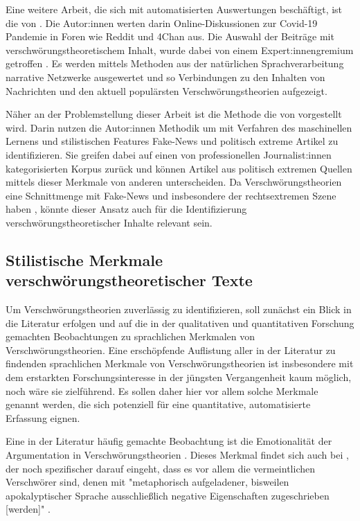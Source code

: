 Eine weitere Arbeit, die sich mit automatisierten Auswertungen beschäftigt, ist die von \textcite{shahsavari_2020}.
Die Autor:innen werten darin Online-Diskussionen zur Covid-19 Pandemie in Foren wie Reddit und 4Chan aus.
Die Auswahl der Beiträge mit verschwörungstheoretischem Inhalt, wurde dabei von einem Expert:innengremium getroffen \parencite[284f]{shahsavari_2020}.
Es werden mittels Methoden aus der natürlichen Sprachverarbeitung narrative Netzwerke ausgewertet und so Verbindungen zu den Inhalten von Nachrichten und den aktuell populärsten Verschwörungstheorien aufgezeigt.

Näher an der Problemstellung dieser Arbeit ist die Methode die von \textcite{potthast_2018} vorgestellt wird.
Darin nutzen die Autor:innen Methodik um mit Verfahren des maschinellen Lernens und stilistischen Features Fake-News und politisch extreme Artikel zu identifizieren.
Sie greifen dabei auf einen von professionellen Journalist:innen kategorisierten Korpus zurück und können Artikel aus politisch extremen Quellen mittels dieser Merkmale von anderen unterscheiden.
Da Verschwörungstheorien eine Schnittmenge mit Fake-News und insbesondere der rechtsextremen Szene haben \parencite[vgl.][]{stumpf_2019}, könnte dieser Ansatz auch für die Identifizierung verschwörungstheoretischer Inhalte relevant sein.

\subsection{Stilistische Merkmale verschwörungstheoretischer Texte}

Um Verschwörungstheorien zuverlässig zu identifizieren, soll zunächst ein Blick in die Literatur erfolgen und auf die in der qualitativen und quantitativen Forschung gemachten Beobachtungen zu sprachlichen Merkmalen von Verschwörungstheorien.
Eine erschöpfende Auflistung aller in der Literatur zu findenden sprachlichen Merkmale von Verschwörungstheorien ist insbesondere mit dem erstarkten Forschungsinteresse in der jüngsten Vergangenheit kaum möglich, noch wäre sie zielführend.
Es sollen daher hier vor allem solche Merkmale genannt werden, die sich potenziell für eine quantitative, automatisierte Erfassung eignen.

Eine in der Literatur häufig gemachte Beobachtung ist die Emotionalität der Argumentation in Verschwörungstheorien \parencite[vgl.][10]{miller_2002}.
Dieses Merkmal findet sich auch bei \textcite[][93ff]{butter_2018}, der noch spezifischer darauf eingeht, dass es vor allem die vermeintlichen Verschwörer sind, denen mit "metaphorisch aufgeladener, bisweilen apokalyptischer Sprache ausschließlich negative Eigenschaften zugeschrieben [werden]" \parencite[][93f]{butter_2018}.

